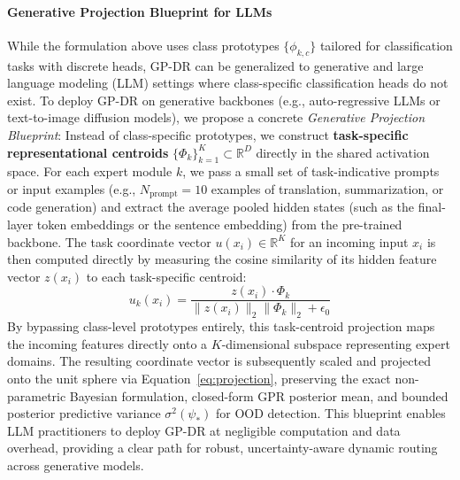 \paragraph{Generative Projection Blueprint for LLMs}
While the formulation above uses class prototypes $\{\phi_{k,c}\}$ tailored for classification tasks with discrete heads, GP-DR can be generalized to generative and large language modeling (LLM) settings where class-specific classification heads do not exist. To deploy GP-DR on generative backbones (e.g., auto-regressive LLMs or text-to-image diffusion models), we propose a concrete \emph{Generative Projection Blueprint}:
Instead of class-specific prototypes, we construct \textbf{task-specific representational centroids} $\{\Phi_k\}_{k=1}^K \subset \mathbb{R}^D$ directly in the shared activation space. For each expert module $k$, we pass a small set of task-indicative prompts or input examples (e.g., $N_{\text{prompt}} = 10$ examples of translation, summarization, or code generation) and extract the average pooled hidden states (such as the final-layer token embeddings or the sentence embedding) from the pre-trained backbone. 
The task coordinate vector $u(x_i) \in \mathbb{R}^K$ for an incoming input $x_i$ is then computed directly by measuring the cosine similarity of its hidden feature vector $z(x_i)$ to each task-specific centroid:
\begin{equation}
u_k(x_i) = \frac{z(x_i) \cdot \Phi_k}{\|z(x_i)\|_2 \|\Phi_k\|_2 + \epsilon_0}
\end{equation}
By bypassing class-level prototypes entirely, this task-centroid projection maps the incoming features directly onto a $K$-dimensional subspace representing expert domains. The resulting coordinate vector is subsequently scaled and projected onto the unit sphere via Equation~\ref{eq:projection}, preserving the exact non-parametric Bayesian formulation, closed-form GPR posterior mean, and bounded posterior predictive variance $\sigma^2(\psi_*)$ for OOD detection. This blueprint enables LLM practitioners to deploy GP-DR at negligible computation and data overhead, providing a clear path for robust, uncertainty-aware dynamic routing across generative models.

